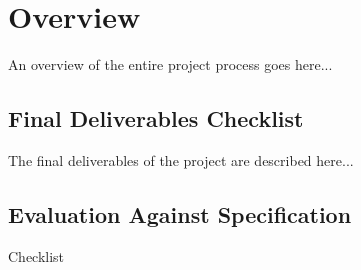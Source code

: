 \chapter{Overview}
An overview of the entire project process goes here...

\section{Final Deliverables Checklist}
The final deliverables of the project are described here...

\section{Evaluation Against Specification}
Checklist
